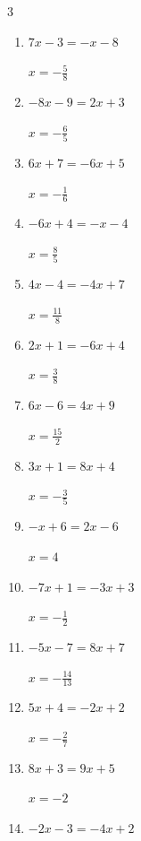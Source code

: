 \begin{multicols}{3}
\begin{enumerate}
        $\displaystyle x=\frac{3}{17}$

  \item $7x-3=-x-8$

        $\displaystyle x=-\frac{5}{8}$

  \item $-8x-9=2x+3$

        $\displaystyle x=-\frac{6}{5}$

  \item $6x+7=-6x+5$

        $\displaystyle x=-\frac{1}{6}$

  \item $-6x+4=-x-4$

        $\displaystyle x=\frac{8}{5}$

\columnbreak %

\resetques

  \item $4x-4=-4x+7$

        $\displaystyle x=\frac{11}{8}$

  \item $2x+1=-6x+4$

        $\displaystyle x=\frac{3}{8}$

  \item $6x-6=4x+9$

        $\displaystyle x=\frac{15}{2}$

  \item $3x+1=8x+4$

        $\displaystyle x=-\frac{3}{5}$

  \item $-x+6=2x-6$

        $\displaystyle x=4$

  \item $-7x+1=-3x+3$

        $\displaystyle x=-\frac{1}{2}$

  \item $-5x-7=8x+7$

        $\displaystyle x=-\frac{14}{13}$

  \item $5x+4=-2x+2$

        $\displaystyle x=-\frac{2}{7}$

  \item $8x+3=9x+5$

        $\displaystyle x=-2$

  \item $-2x-3=-4x+2$


\end{enumerate}
\end{multicols}
